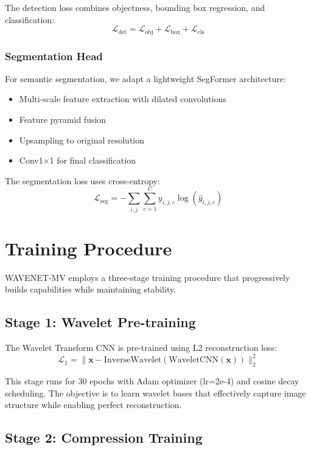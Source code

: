 \documentclass[conference]{IEEEtran}
\begin{document}
The detection loss combines objectness, bounding box regression, and classification:
\begin{equation}
\mathcal{L}_{\text{det}} = \mathcal{L}_{\text{obj}} + \mathcal{L}_{\text{box}} + \mathcal{L}_{\text{cls}}
\end{equation}

\subsubsection{Segmentation Head}
For semantic segmentation, we adapt a lightweight SegFormer architecture:
\begin{itemize}
\item Multi-scale feature extraction with dilated convolutions
\item Feature pyramid fusion
\item Upsampling to original resolution
\item Conv1×1 for final classification
\end{itemize}

The segmentation loss uses cross-entropy:
\begin{equation}
\mathcal{L}_{\text{seg}} = -\sum_{i,j} \sum_{c=1}^{C} y_{i,j,c} \log(\hat{y}_{i,j,c})
\end{equation}

\section{Training Procedure}

WAVENET-MV employs a three-stage training procedure that progressively builds capabilities while maintaining stability.

\subsection{Stage 1: Wavelet Pre-training}

The Wavelet Transform CNN is pre-trained using L2 reconstruction loss:
\begin{equation}
\mathcal{L}_1 = \|\mathbf{x} - \text{InverseWavelet}(\text{WaveletCNN}(\mathbf{x}))\|_2^2
\end{equation}

This stage runs for 30 epochs with Adam optimizer (lr=2e-4) and cosine decay scheduling. The objective is to learn wavelet bases that effectively capture image structure while enabling perfect reconstruction.

\subsection{Stage 2: Compression Training}
\end{document}
